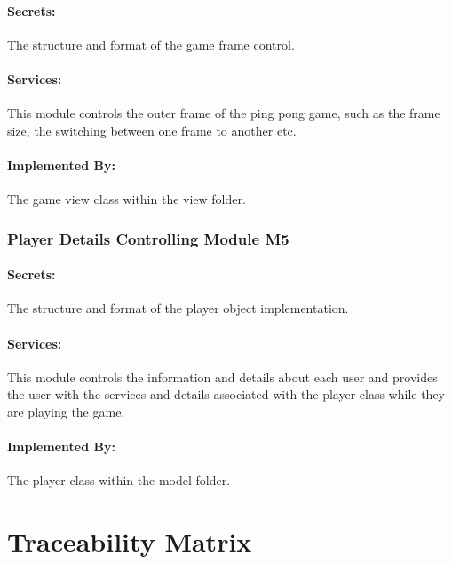 \documentclass[12pt,letterpaper]{article}
\begin{document}
	\paragraph{Secrets: } The structure and format of the game frame control.
	\paragraph{Services: }This module controls the outer frame of the ping pong game, such as the frame size, the switching between one frame to another etc. 
	\paragraph{Implemented By: } The game view class within the view folder.

	\subsubsection{Player Details Controlling Module M5}
	\paragraph{Secrets: } The structure and format of the player object implementation.
	\paragraph{Services: } This module controls the information and details about each user and provides the user with the services and details associated with the player class while they are playing the game.
	\paragraph{Implemented By: } The player class within the model folder.

	\section{Traceability Matrix}
\end{document}

